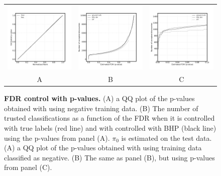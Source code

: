 \documentclass{article}
\begin{document}
\begin{figure}
	\centering
	\begin{tabular}{ccc}
 		\includegraphics[width=2in]{img/cnn_QQ_with_labels.png} &
		\includegraphics[width=2in]{img/cnn_test_pred_with_labels.png} & 
            \includegraphics[width=2in]
            {img/cnn_test_pred_with_labels_loc.png}
		\\
		A & B & C
	\end{tabular}
	\caption{{\bf FDR control with p-values.}
		(A) a QQ plot of the p-values obtained with using negative training data. (B) The number of trusted classifications as a function of the FDR when it is controlled with true labels (red line) and with controlled with BHP (black line) using the p-values from panel (A). $\pi_0$ is estimated on the test data.
		(A) a QQ plot of the p-values obtained with using training data classified as negative. (B) The same as panel (B), but using p-values from panel (C).
	}
	\label{fig:examples}
\end{figure}  
\end{document}
